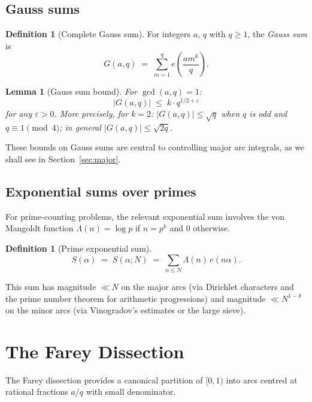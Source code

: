 \documentclass[12pt,a4paper]{amsart}
\newtheorem{lemma}[theorem]{Lemma}
\theoremstyle{definition}
\newtheorem{definition}[theorem]{Definition}
\newcommand{\eq}[1]{e\!\left(#1\right)}
\begin{document}
\subsection{Gauss sums}

\begin{definition}[Complete Gauss sum]
  For integers $a$, $q$ with $q \geq 1$, the \emph{Gauss sum} is
  \[
    G(a, q) \;=\; \sum_{m=1}^{q} \eq{\frac{a m^k}{q}}.
  \]
\end{definition}

\begin{lemma}[Gauss sum bound]\label{lem:gauss}
  For $\gcd(a, q) = 1$:
  \[
    |G(a, q)| \;\leq\; k \cdot q^{1/2 + \varepsilon}
  \]
  for any $\varepsilon > 0$.  More precisely, for $k = 2$:
  $|G(a,q)| \leq \sqrt{q}$ when $q$ is odd and $q \equiv 1 \pmod 4$;
  in general $|G(a,q)| \leq \sqrt{2q}$.
\end{lemma}

These bounds on Gauss sums are central to controlling major arc
integrals, as we shall see in Section~\ref{sec:major}.

\subsection{Exponential sums over primes}

For prime-counting problems, the relevant exponential sum involves the
von Mangoldt function $\Lambda(n) = \log p$ if $n = p^k$ and $0$ otherwise.

\begin{definition}[Prime exponential sum]
  \[
    S(\alpha) \;=\; S(\alpha; N)
    \;=\; \sum_{n \leq N} \Lambda(n)\, \eq{n\alpha}.
  \]
\end{definition}

This sum has magnitude $\ll N$ on the major arcs (via Dirichlet
characters and the prime number theorem for arithmetic progressions)
and magnitude $\ll N^{1-\delta}$ on the minor arcs (via Vinogradov's
estimates or the large sieve).

\section{The Farey Dissection}
\label{sec:farey}

The Farey dissection provides a canonical partition of $[0,1)$ into
arcs centred at rational fractions $a/q$ with small denominator.
\end{document}
